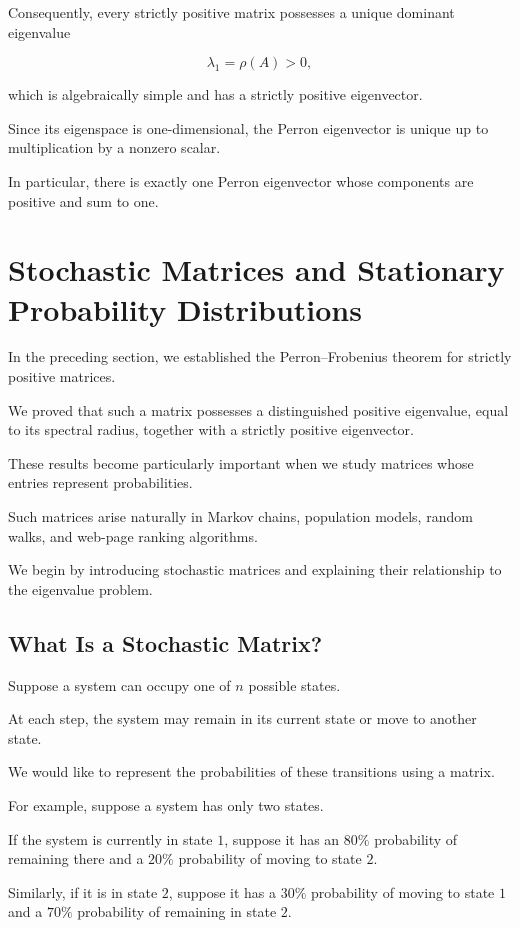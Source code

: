 \documentclass[11pt,a4paper]{article}
\theoremstyle{definition}
\theoremstyle{remark}
\begin{document}
Consequently, every strictly
positive matrix possesses a
unique dominant eigenvalue

\[
\lambda_1=\rho(A)>0,
\]

which is algebraically simple
and has a strictly positive
eigenvector.

Since its eigenspace is
one-dimensional, the Perron
eigenvector is unique
up to multiplication by
a nonzero scalar.

In particular, there is
exactly one Perron eigenvector
whose components are positive
and sum to one.

\section{Stochastic Matrices and Stationary
Probability Distributions}

In the preceding section, we established
the Perron--Frobenius theorem for strictly
positive matrices.

We proved that such a matrix possesses
a distinguished positive eigenvalue,
equal to its spectral radius, together
with a strictly positive eigenvector.

These results become particularly
important when we study matrices
whose entries represent probabilities.

Such matrices arise naturally in
Markov chains, population models,
random walks, and web-page ranking
algorithms.

We begin by introducing stochastic
matrices and explaining their
relationship to the eigenvalue problem.

\subsection{What Is a Stochastic Matrix?}

Suppose a system can occupy one
of $n$ possible states.

At each step, the system may
remain in its current state
or move to another state.

We would like to represent
the probabilities of these
transitions using a matrix.

For example, suppose a system
has only two states.

If the system is currently in
state $1$, suppose it has an
$80\%$ probability of remaining
there and a $20\%$ probability
of moving to state $2$.

Similarly, if it is in state $2$,
suppose it has a $30\%$
probability of moving to state $1$
and a $70\%$ probability of
remaining in state $2$.
\end{document}
